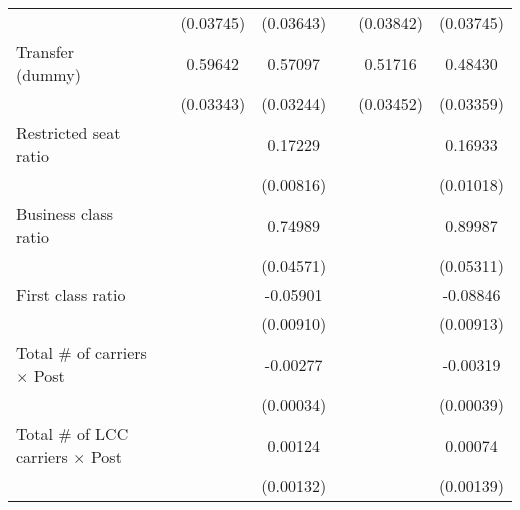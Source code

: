 \begin{table}[htbp]
\begin{tabular}{l*{6}{c}}
                    &                     &   (0.03745)         &   (0.03643)         &                     &   (0.03842)         &   (0.03745)         \\
\addlinespace
\shortstack{Transfer \\ (dummy)}&                     &     0.59642\sym{***}&     0.57097\sym{***}&                     &     0.51716\sym{***}&     0.48430\sym{***}\\
                    &                     &   (0.03343)         &   (0.03244)         &                     &   (0.03452)         &   (0.03359)         \\
\addlinespace
Restricted seat ratio&                     &                     &     0.17229\sym{***}&                     &                     &     0.16933\sym{***}\\
                    &                     &                     &   (0.00816)         &                     &                     &   (0.01018)         \\
\addlinespace
Business class ratio&                     &                     &     0.74989\sym{***}&                     &                     &     0.89987\sym{***}\\
                    &                     &                     &   (0.04571)         &                     &                     &   (0.05311)         \\
\addlinespace
First class ratio   &                     &                     &    -0.05901\sym{***}&                     &                     &    -0.08846\sym{***}\\
                    &                     &                     &   (0.00910)         &                     &                     &   (0.00913)         \\
\addlinespace
Total # of carriers $\times$ Post&                     &                     &    -0.00277\sym{***}&                     &                     &    -0.00319\sym{***}\\
                    &                     &                     &   (0.00034)         &                     &                     &   (0.00039)         \\
\addlinespace
Total # of LCC carriers $\times$ Post&                     &                     &     0.00124         &                     &                     &     0.00074         \\
                    &                     &                     &   (0.00132)         &                     &                     &   (0.00139)         \\

\end{tabular}
\end{table}
